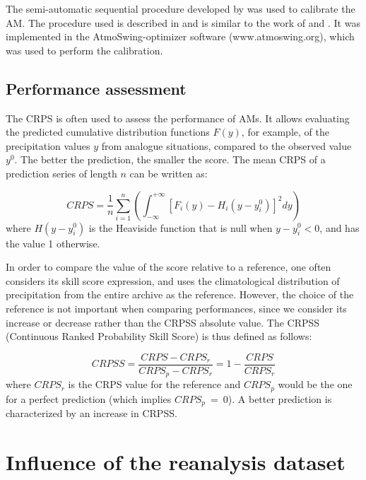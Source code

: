 \documentclass{ametsoc}
\begin{document}
The semi-automatic sequential procedure developed by \citet{Bontron2004} was used to calibrate the AM. The procedure used is described in \citet{Horton2017c} and is similar to the work of \citet{Radanovics2013} and \citet{BenDaoud2016}. It was implemented in the AtmoSwing-optimizer software (www.atmoswing.org), which was used to perform the calibration.


\subsection{Performance assessment}

The CRPS \citep[Continuous Ranked Probability Score,][]{Brown1974, Matheson1976, Hersbach2000} is often used to assess the performance of AMs. It allows evaluating the predicted cumulative distribution functions $F(y)$, for example, of the precipitation values $y$ from analogue situations, compared to the observed value $y^{0}$. The better the prediction, the smaller the score. The mean CRPS of a prediction series of length $n$ can be written as:

\begin{equation}
\label{eq:CRPS}
CRPS = \frac{1}{n} \sum_{i=1}^{n} \left(  \int_{-\infty}^{+\infty} \left[ F_{i}(y)-H_{i}(y-y_{i}^{0})\right]^{2} dy \right) 
\end{equation}
where $H(y-y_{i}^{0})$ is the Heaviside function that is null when $y-y_{i}^{0}<0$, and has the value 1 otherwise.

In order to compare the value of the score relative to a reference, one often considers its skill score expression, and uses the climatological distribution of precipitation from the entire archive as the reference. However, the choice of the reference is not important when comparing performances, since we consider its increase or decrease rather than the CRPSS absolute value. The CRPSS (Continuous Ranked Probability Skill Score) is thus defined as follows:

\begin{equation}
\label{eq:CRPSS}
CRPSS = \frac{CRPS-CRPS_{r}}{CRPS_{p}-CRPS_{r}} = 1-\frac{CRPS}{CRPS_{r}}
\end{equation}
where $CRPS_{r}$ is the CRPS value for the reference and $CRPS_{p}$ would be the one for a perfect prediction (which implies $CRPS_{p}~=~0$). A better prediction is characterized by an increase in CRPSS.



\section{Influence of the reanalysis dataset}
\end{document}
